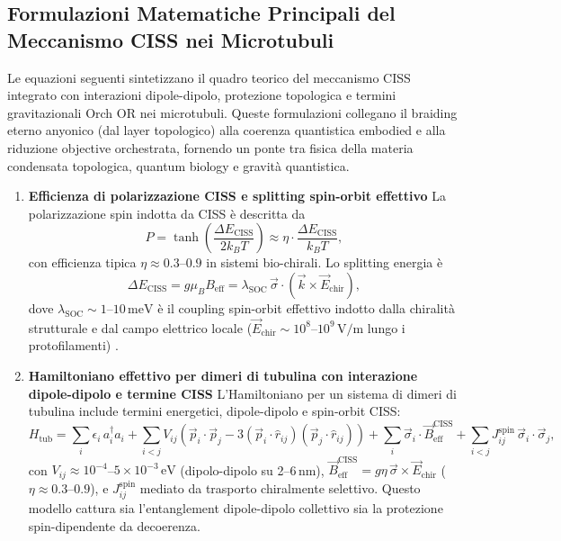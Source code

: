 \documentclass[11pt,a4paper]{article}
\let\oldcite\cite
\renewcommand{\cite}{\protect\oldcite}
\theoremstyle{plain}
\theoremstyle{definition}
\begin{document}
\subsection{Formulazioni Matematiche Principali del Meccanismo CISS nei Microtubuli}

Le equazioni seguenti sintetizzano il quadro teorico del meccanismo CISS integrato con interazioni dipole-dipolo, protezione topologica e termini gravitazionali Orch OR nei microtubuli. Queste formulazioni collegano il braiding eterno anyonico (dal layer topologico) alla coerenza quantistica embodied e alla riduzione objective orchestrata, fornendo un ponte tra fisica della materia condensata topologica, quantum biology e gravità quantistica.

\begin{enumerate}
    \item \textbf{Efficienza di polarizzazione CISS e splitting spin-orbit effettivo}  
    La polarizzazione spin indotta da CISS è descritta da
    \begin{equation}
    P = \tanh\left( \frac{\Delta E_{\mathrm{CISS}}}{2 k_B T} \right) \approx \eta \cdot \frac{\Delta E_{\mathrm{CISS}}}{k_B T},
    \label{eq:ciss_polarization}
    \end{equation}
    con efficienza tipica $\eta \approx 0.3$--$0.9$ in sistemi bio-chirali. Lo splitting energia è
    \begin{equation}
    \Delta E_{\mathrm{CISS}} = g \mu_B B_{\mathrm{eff}} = \lambda_{\mathrm{SOC}} \, \vec{\sigma} \cdot (\vec{k} \times \vec{E}_{\mathrm{chir}}),
    \label{eq:ciss_splitting}
    \end{equation}
    dove $\lambda_{\mathrm{SOC}} \sim 1$--$10\,\mathrm{meV}$ è il coupling spin-orbit effettivo indotto dalla chiralità strutturale e dal campo elettrico locale ($\vec{E}_{\mathrm{chir}} \sim 10^8$--$10^9\,\mathrm{V/m}$ lungo i protofilamenti) \cite{naaman2019spin, naaman2020spin, sala2026spin, kumar2026ciss}.

    \item \textbf{Hamiltoniano effettivo per dimeri di tubulina con interazione dipole-dipolo e termine CISS}  
    L'Hamiltoniano per un sistema di dimeri di tubulina include termini energetici, dipole-dipolo e spin-orbit CISS:
    \begin{equation}
    H_{\mathrm{tub}} = \sum_{i} \epsilon_i \, a_i^\dagger a_i 
    + \sum_{i<j} V_{ij} \left( \vec{p}_i \cdot \vec{p}_j - 3 (\vec{p}_i \cdot \hat{r}_{ij}) (\vec{p}_j \cdot \hat{r}_{ij}) \right)
    + \sum_i \vec{\sigma}_i \cdot \vec{B}_{\mathrm{eff}}^{\mathrm{CISS}} 
    + \sum_{i<j} J_{ij}^{\mathrm{spin}} \, \vec{\sigma}_i \cdot \vec{\sigma}_j,
    \label{eq:hamiltonian_tubulin_ciss}
    \end{equation}
    con $V_{ij} \approx 10^{-4}$--$5\times10^{-3}\,\mathrm{eV}$ (dipolo-dipolo su 2--6\,nm), $\vec{B}_{\mathrm{eff}}^{\mathrm{CISS}} = g \eta \, \vec{\sigma} \times \vec{E}_{\mathrm{chir}}$ ($\eta \approx 0.3$--$0.9$), e $J_{ij}^{\mathrm{spin}}$ mediato da trasporto chiralmente selettivo. Questo modello cattura sia l'entanglement dipole-dipolo collettivo sia la protezione spin-dipendente da decoerenza.


\end{enumerate}
\end{document}

